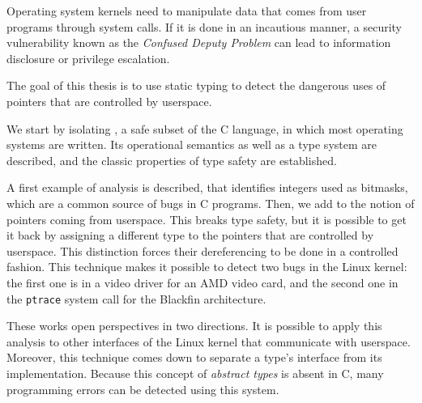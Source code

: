 \begin{headingpage}
Operating system kernels need to manipulate data that comes from user programs
through system calls. If it is done in an incautious manner, a security
vulnerability known as the \emph{Confused Deputy Problem} can lead to
information disclosure or privilege escalation.

The goal of this thesis is to use static typing to detect the dangerous uses of
pointers that are controlled by userspace.

We start by isolating \langname{}, a safe subset of the C language, in which
most operating systems are written. Its operational semantics as well as a type
system are described, and the classic properties of type safety are established.

A first example of analysis is described, that identifies integers used as
bitmasks, which are a common source of bugs in C programs. Then, we add to
\langname the notion of pointers coming from userspace. This breaks type safety,
but it is possible to get it back by assigning a different type to the pointers
that are controlled by userspace. This distinction forces their dereferencing to
be done in a controlled fashion. This technique makes it possible to detect two
bugs in the Linux kernel: the first one is in a video driver for an AMD
video card, and the second one in the \texttt{ptrace} system call for the
Blackfin architecture.

These works open perspectives in two directions. It is possible to apply
this analysis to other interfaces of the Linux kernel that communicate with
userspace. Moreover, this technique comes down to separate a type's interface
from its implementation. Because this concept of \emph{abstract types} is absent
in C, many programming errors can be detected using this system.





\end{headingpage}
\restoregeometry{}

